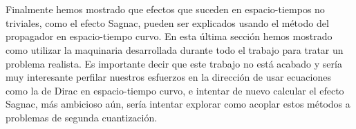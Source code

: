 \\
\\
Finalmente hemos mostrado que efectos que suceden en espacio-tiempos no triviales, como el efecto Sagnac, pueden ser explicados usando el método del propagador en espacio-tiempo curvo. En esta última sección hemos mostrado como utilizar la maquinaria desarrollada durante todo el trabajo para tratar un problema realista. Es importante decir que este trabajo no está acabado y sería muy interesante perfilar nuestros esfuerzos en la dirección de usar ecuaciones como la de Dirac en espacio-tiempo curvo, e intentar de nuevo calcular el efecto Sagnac, más ambicioso aún, sería intentar explorar como acoplar estos métodos a problemas de segunda cuantización.